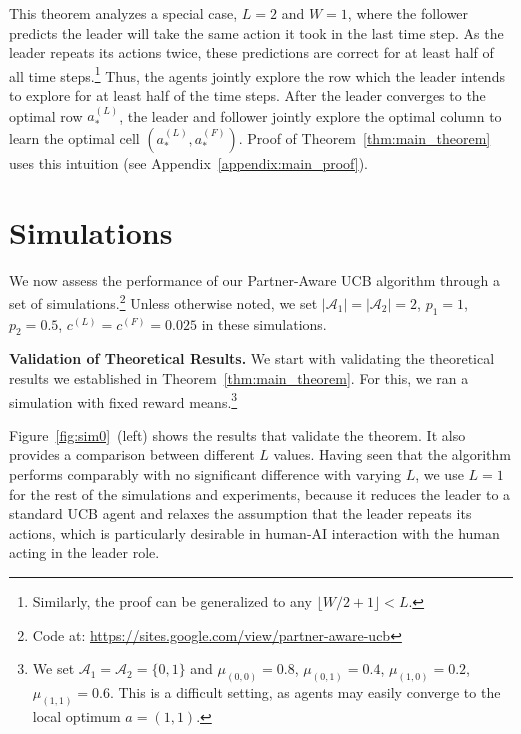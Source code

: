 \documentclass[letterpaper]{article} %
\theoremstyle{definition}
\def\mc{\mathcal}
\begin{document}
This theorem analyzes a special case, $L\!=\!2$ and $W\!=\!1$, where the follower predicts the leader will take the same action it took in the last time step. As the leader repeats its actions twice, these predictions are correct for at least half of all time steps.\footnote{Similarly, the proof can be generalized to any $\lfloor\! W/2 \!+ \!1\!\rfloor \!<\! L$.} Thus, the agents jointly explore the row which the leader intends to explore for at least half of the time steps. After the leader converges to the optimal row $a^{(L)}_{\ast}$, the leader and follower jointly explore the optimal column to learn the optimal cell $(a^{(L)}_{\ast}, a^{(F)}_{\ast})$. Proof of Theorem~\ref{thm:main_theorem} uses this intuition (see Appendix~\ref{appendix:main_proof}).






\section{Simulations}
\label{sec:sim}
We now assess the performance of our Partner-Aware UCB algorithm through a set of simulations.\footnote{Code at: \url{https://sites.google.com/view/partner-aware-ucb}} Unless otherwise noted, we set $|\mc{A}_1|=|\mc{A}_2|=2$, $p_1=1$, $p_2=0.5$, $c^{(L)}=c^{(F)}=0.025$ in these simulations.

\smallskip
\noindent\textbf{Validation of Theoretical Results.} \label{subsec:sim0}
We start with validating the theoretical results we established in Theorem~\ref{thm:main_theorem}.
For this, we ran a simulation with fixed reward means.\footnote{We set $\mc{A}_1=\mc{A}_2=\{0,1\}$ and $\mu_{(0,0)}=0.8$, $\mu_{(0,1)}=0.4$, $\mu_{(1,0)}=0.2$, $\mu_{(1,1)}=0.6$. This is a difficult setting, as agents may easily converge to the local optimum $a=(1,1)$.}

Figure~\ref{fig:sim0}~(left) shows the results that validate the theorem. It also provides a comparison between different $L$ values. Having seen that the algorithm performs comparably with no significant difference with varying $L$, we use $L=1$ for the rest of the simulations and experiments, because it reduces the leader to a standard UCB agent and relaxes the assumption that the leader repeats its actions, which is particularly desirable in human-AI interaction with the human acting in the leader role. 
\end{document}
